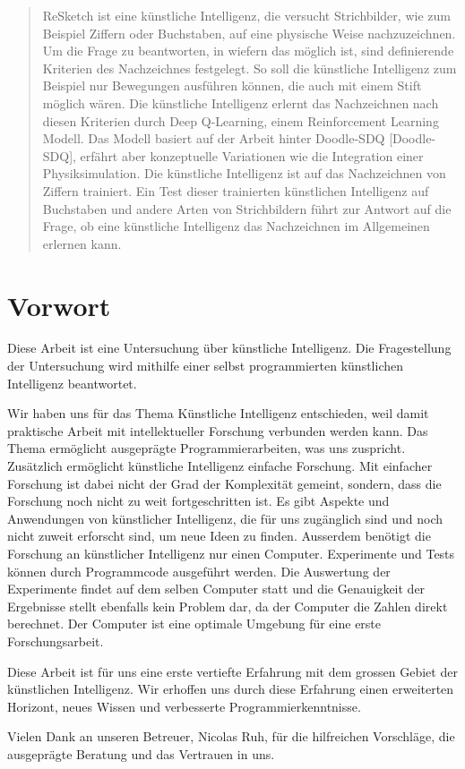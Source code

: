 \begin{abstract}
ReSketch ist eine künstliche Intelligenz, die versucht Strichbilder, wie zum
Beispiel Ziffern oder Buchstaben, auf eine physische Weise nachzuzeichnen. Um
die Frage zu beantworten, in wiefern das möglich ist, sind definierende
Kriterien des Nachzeichnes festgelegt. So soll die künstliche Intelligenz zum
Beispiel nur Bewegungen ausführen können, die auch mit einem Stift möglich
wären. Die künstliche Intelligenz erlernt das Nachzeichnen nach diesen Kriterien durch
Deep Q-Learning, einem Reinforcement Learning Modell. Das Modell basiert auf der
Arbeit hinter Doodle-SDQ [Doodle-SDQ], erfährt aber konzeptuelle Variationen wie
die Integration einer Physiksimulation. Die künstliche Intelligenz ist auf das
Nachzeichnen von Ziffern trainiert. Ein Test dieser trainierten künstlichen Intelligenz auf
Buchstaben und andere Arten von Strichbildern führt zur Antwort auf die Frage,
ob eine künstliche Intelligenz das Nachzeichnen im Allgemeinen erlernen kann.
\end{abstract}

\newpage

\section*{Vorwort}
Diese Arbeit ist eine Untersuchung über künstliche Intelligenz. Die
Fragestellung der Untersuchung wird mithilfe einer selbst programmierten künstlichen
Intelligenz beantwortet. 

Wir haben uns für das Thema Künstliche Intelligenz entschieden, weil damit
praktische Arbeit mit intellektueller Forschung verbunden werden kann. Das Thema
ermöglicht ausgeprägte Programmierarbeiten, was uns zuspricht. Zusätzlich
ermöglicht künstliche Intelligenz einfache Forschung. Mit einfacher Forschung
ist dabei nicht der Grad der Komplexität gemeint, sondern, dass die Forschung
noch nicht zu weit fortgeschritten ist. Es gibt Aspekte und Anwendungen von
künstlicher Intelligenz, die für uns zugänglich sind und noch nicht zuweit
erforscht sind, um neue Ideen zu finden. Ausserdem benötigt die Forschung an
künstlicher Intelligenz nur einen Computer. Experimente und Tests können durch
Programmcode ausgeführt werden. Die Auswertung der Experimente findet auf dem
selben Computer statt und die Genauigkeit der Ergebnisse stellt ebenfalls kein Problem dar,
da der Computer die Zahlen direkt berechnet. Der Computer ist eine
optimale Umgebung für eine erste Forschungsarbeit.

Diese Arbeit ist für uns eine erste vertiefte Erfahrung mit dem grossen Gebiet
der künstlichen Intelligenz. Wir erhoffen uns durch diese Erfahrung einen
erweiterten Horizont, neues Wissen und verbesserte Programmierkenntnisse.

Vielen Dank an unseren Betreuer, Nicolas Ruh, für die hilfreichen Vorschläge,
die ausgeprägte Beratung und das Vertrauen in uns.

